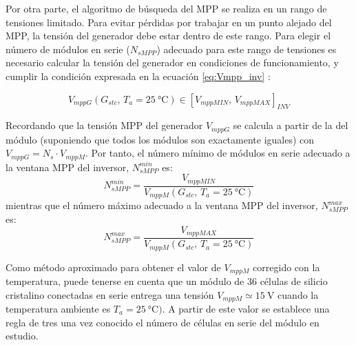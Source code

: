 Por otra parte, el algoritmo de búsqueda del MPP se realiza en un
rango de tensiones limitado. Para evitar pérdidas por trabajar en
un punto alejado del MPP, la tensión del generador debe estar dentro
de este rango. Para elegir el número de módulos en serie ($N_{sMPP}$)
adecuado para este rango de tensiones es necesario calcular la tensión
del generador en condiciones de funcionamiento, y cumplir la condición
expresada en la ecuación
\ref{eq:Vmpp_inv}
: 

\begin{equation}
V_{mppG}(G_{stc},\, T_{a}=\SI{25}{\celsius})\in\left[V_{mppMIN},\,
  V_{mppMAX}\right]_{INV}\label{eq:Vmpp_inv}
\end{equation}

Recordando que la tensión MPP del generador $V_{mppG}$ se calcula a partir de la del módulo 
(suponiendo que todos los módulos son exactamente iguales) con
$V_{mppG}=N_{s}\cdot V_{mppM}$. Por tanto, el número mínimo de módulos en serie adecuado a la ventana
MPP del inversor, $N_{sMPP}^{min}$ es:
\begin{equation}
  \label{eq:Ns_mpp_min}
  N_{sMPP}^{min}=\frac{V_{mppMIN}}{V_{mppM}(G_{stc},\, T_{a}=\SI{25}{\celsius})}
\end{equation}
mientras que el número máximo adecuado a la ventana MPP del inversor, $N_{sMPP}^{max}$ es:
\begin{equation}
  \label{eq:Ns_mpp_max}
  N_{sMPP}^{max}=\frac{V_{mppMAX}}{V_{mppM}(G_{stc},\, T_{a}=\SI{25}{\celsius})}
\end{equation}

Como método aproximado para obtener el valor de $V_{mppM}$ corregido
con la temperatura, puede tenerse en cuenta que un módulo de 36 células
de silicio cristalino conectadas en serie entrega una tensión $V_{mppM}\simeq\SI{15}{\volt}$
cuando la temperatura ambiente es $T_{a}=\SI{25}{\celsius})$. A partir
de este valor se establece una regla de tres una vez conocido el número
de células en serie del módulo en estudio. 

